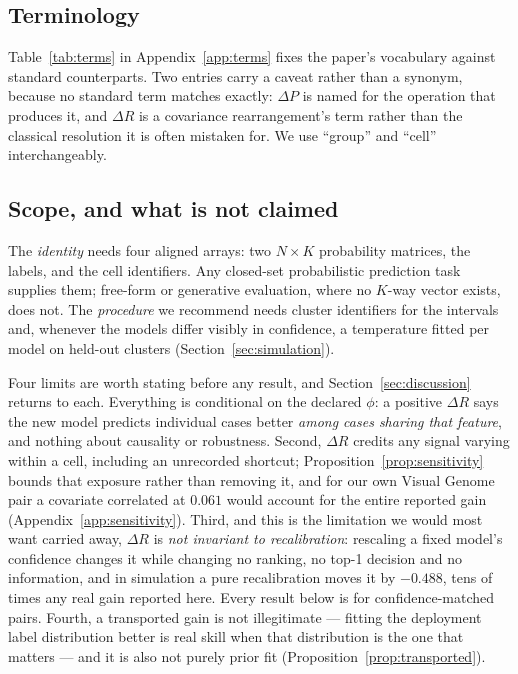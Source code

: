 \subsection{Terminology}\label{sec:terminology}

Table~\ref{tab:terms} in Appendix~\ref{app:terms} fixes the paper's vocabulary against
standard counterparts. Two entries carry a caveat rather than a synonym, because no standard
term matches exactly: $\Delta P$ is named for the operation that produces it, and $\Delta R$
is a covariance rearrangement's term rather than the classical resolution it is often
mistaken for. We use ``group'' and ``cell'' interchangeably.

\subsection{Scope, and what is not claimed}\label{sec:scope}

The \emph{identity} needs four aligned arrays: two $N\times K$ probability matrices, the
labels, and the cell identifiers. Any closed-set probabilistic prediction task supplies
them; free-form or generative evaluation, where no $K$-way vector exists, does not. The
\emph{procedure} we recommend needs cluster identifiers for the intervals and, whenever
the models differ visibly in confidence, a temperature fitted per model on held-out
clusters (Section~\ref{sec:simulation}).

Four limits are worth stating before any result, and Section~\ref{sec:discussion} returns
to each. Everything is conditional on the declared $\phi$: a positive $\Delta R$ says the
new model predicts individual cases better \emph{among cases sharing that feature}, and
nothing about causality or robustness. Second, $\Delta R$ credits any signal varying
within a cell, including an unrecorded shortcut; Proposition~\ref{prop:sensitivity} bounds that exposure rather than removing it, and
for our own Visual Genome pair a covariate correlated at $0.061$ would account for the
entire reported gain (Appendix~\ref{app:sensitivity}). Third, and this is
the limitation we would most want carried away, $\Delta R$ is \emph{not invariant to
recalibration}: rescaling a fixed model's confidence changes it while changing no ranking,
no top-1 decision and no information, and in simulation a pure recalibration moves it by
$-0.488$, tens of times any real gain reported here. Every result below is for
confidence-matched pairs. Fourth, a transported gain is not illegitimate --- fitting the
deployment label distribution better is real skill when that distribution is the one that
matters --- and it is also not purely prior fit
(Proposition~\ref{prop:transported}).

